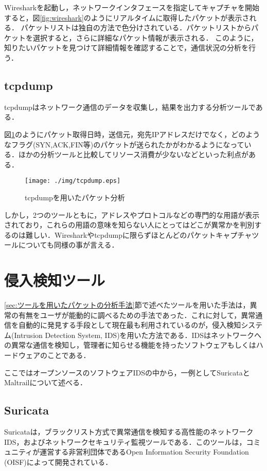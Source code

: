\documentclass{thesis}
\begin{document}
Wiresharkを起動し，ネットワークインタフェースを指定してキャプチャを開始すると，図\ref{fig:wireshark}のようにリアルタイムに取得したパケットが表示される．
パケットリストは独自の方法で色分けされている．パケットリストからパケットを選択すると，さらに詳細なパケット情報が表示される．
このように，知りたいパケットを見つけて詳細情報を確認することで，通信状況の分析を行う．

\subsection*{tcpdump}

tcpdumpはネットワーク通信のデータを収集し，結果を出力する分析ツールである．

図\ref{fig:tcpdump}のようにパケット取得日時，送信元，宛先IPアドレスだけでなく，どのようなフラグ(SYN,ACK,FIN等)のパケットが送られたかがわかるようになっている．ほかの分析ツールと比較してリソース消費が少ないなどといった利点がある．


\begin{figure}[H]
 \center
 \texttt{[image: ./img/tcpdump.eps]}
 \caption{tcpdumpを用いたパケット分析}
 \label{fig:tcpdump}
\end{figure}

しかし，2つのツールともに，アドレスやプロトコルなどの専門的な用語が表示されており，これらの用語の意味を知らない人にとってはどこが異常かを判別するのは難しい．Wiresharkやtcpdumpに限らずほとんどのパケットキャプチャツールについても同様の事が言える．


\section{侵入検知ツール}
\ref{sec:ツールを用いたパケットの分析手法}節で述べたツールを用いた手法は，異常の有無をユーザが能動的に調べるための手法であった．これに対して，異常通信を自動的に発見する手段として現在最も利用されているのが，侵入検知システム(Intrusion Detection System, IDS)を用いた方法である．IDSはネットワークへの異常な通信を検知し，管理者に知らせる機能を持ったソフトウェアもしくはハードウェアのことである．

ここではオープンソースのソフトウェアIDSの中から，一例としてSuricataとMaltrailについて述べる．

\subsection*{Suricata} 

Suricata\cite{Suricata}は，ブラックリスト方式で異常通信を検知する高性能のネットワークIDS，およびネットワークセキュリティ監視ツールである．このツールは，コミュニティが運営する非営利団体であるOpen Information Security Foundation (OISF)によって開発されている．
\end{document}
